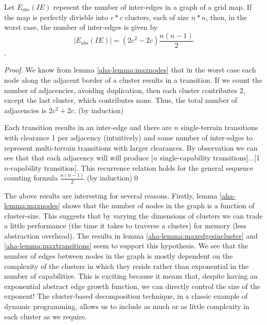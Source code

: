 \begin{lemma}
\label{aha-lemma:maxtransitions}
Let $E_{abs}(IE)$ repesent the number of inter-edges in a graph of a grid map. If the map is perfectly divisble into $c*c$ clusters, each of size $n*n$, then, in the worst case, the number of inter-edges is given by 
$$|E_{abs}(IE)| = (2c^2 - 2c)\frac{n(n-1)}{2}$$.
\end{lemma}

\begin{proof}
We know from lemma \ref{aha-lemma:maxnodes} that in the worst case each node along the adjacent border of a cluster results in a transition. 
If we count the number of adjacencies, avoiding duplication, then each cluster contributes 2, except the last cluster, which contributes none. 
Thus, the total number of adjacencies is $2c^2 + 2c$. (by induction) 
\par \indent
Each transition results in an inter-edge and there are $n$ single-terrain transitions with clearance 1 per adjacency (intuitively) and some number of inter-edges to represent multi-terrain transitions with larger clearances. 
By observation we can see that that each adjacency will will produce [$n$ single-capability transitions]...[1 $n$-capability transition]. 
This recurrence relation holds for the general sequence counting formula $\frac{n(n-1)}{2}$ (by induction)\qed
\end{proof}

The above results are interesting for several reasons. 
Firstly, lemma \ref{aha-lemma:maxnodes} shows that the number of nodes in the graph is a function of cluster-size. This suggests that by varying the dimensions of clusters we can trade a little performance (the time it takes to traverse a cluster) for memory (less abstraction overhead).
The results in lemma \ref{aha-lemma:maxedgesincluster} and \ref{aha-lemma:maxtransitions} seem to support this hypothesis. 
We see that the number of edges between nodes in the graph is mostly dependent on the complexity of the clusters in which they reside rather than exponential in the number of capabilities. 
This is exciting because it means that, despite having an exponential abstract edge growth function, we can directly control the size of the exponent! 
The cluster-based decomposition technique, in a classic example of dynamic programming, allows us to include as much or as little complexity in each cluster as we require.